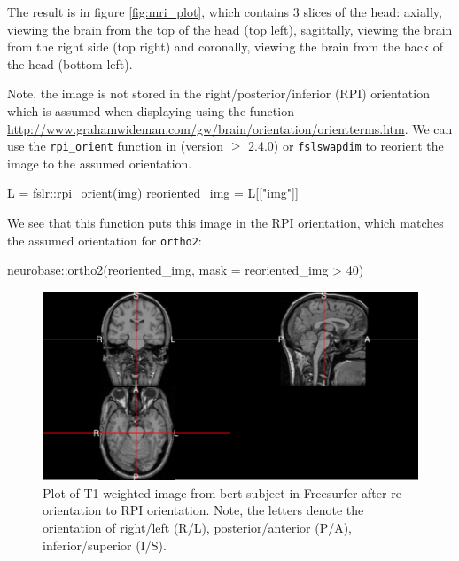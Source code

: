 The result is in figure \ref{fig:mri_plot}, which contains 3 slices of
the head: axially, viewing the brain from the top of the head (top
left), sagittally, viewing the brain from the right side (top right) and
coronally, viewing the brain from the back of the head (bottom left).

Note, the image is not stored in the right/posterior/inferior (RPI)
orientation which is assumed when displaying using the 
 function
\url{http://www.grahamwideman.com/gw/brain/orientation/orientterms.htm}.
We can use the \texttt{rpi\_orient} function in  (version
\(\geq\) 2.4.0) \citep{muschelli2015fslr} or \texttt{fslswapdim} to
reorient the image to the assumed orientation.

\begin{Schunk}
\begin{Sinput}
L = fslr::rpi_orient(img)
reoriented_img = L[["img"]]
\end{Sinput}
\end{Schunk}

We see that this function puts this image in the RPI orientation, which
matches the assumed orientation for \texttt{ortho2}:

\begin{Schunk}
\begin{Sinput}
neurobase::ortho2(reoriented_img, mask = reoriented_img > 40)
\end{Sinput}
\begin{figure}
\includegraphics{muschelli_files/figure-latex/mri_plot2-1} \caption[Plot of T1-weighted image from bert subject in Freesurfer after re-orientation to RPI orientation]{Plot of T1-weighted image from bert subject in Freesurfer after re-orientation to RPI orientation.  Note, the letters denote the orientation of right/left (R/L), posterior/anterior (P/A), inferior/superior (I/S). }\label{fig:mri_plot2}
\end{figure}
\end{Schunk}

